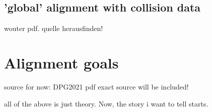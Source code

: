\subsection{'global' alignment with collision data}
wouter pdf. quelle herausfinden!

\section{Alignment goals}
source for now: DPG2021 pdf exact source will be included!

all of the above is just theory. Now, the story i want to tell starts.
